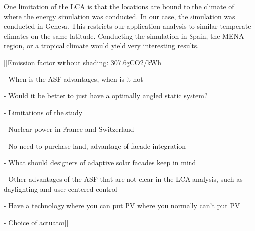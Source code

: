 One limitation of the LCA is that the locations are bound to the climate of where the energy simulation was conducted. In our case, the simulation was conducted in Geneva. This restricts our application analysis to similar temperate climates on the same latitude. Conducting the simulation in Spain, the MENA region, or a tropical climate would yield very interesting results. 






[[Emission factor without shading: 307.6gCO2/kWh

- When is the ASF advantages, when is it not

- Would it be better to just have a optimally angled static system?

- Limitations of the study

- Nuclear power in France and Switzerland

- No need to purchase land, advantage of facade integration

- What should designers of adaptive solar facades keep in mind 

- Other advantages of the ASF that are not clear in the LCA analysis, such as daylighting and user centered control 

- Have a technology where you can put PV where you normally can't put PV

- Choice of actuator]]